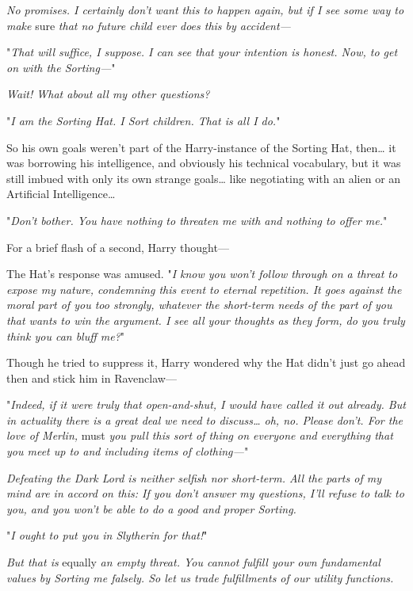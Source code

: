 \emph{No promises. I certainly don't want this to happen again, but if I see 
some way to make} sure\emph{ that no future child ever does this by accident---}

"\emph{That will suffice, I suppose. I can see that your intention is honest. 
Now, to get on with the Sorting---}"

\emph{Wait! What about all my other questions?}

"\emph{I am the Sorting Hat. I Sort children. That is all I do.}"

So his own goals weren't part of the Harry-instance of the Sorting Hat, 
then{\ldots} it was borrowing his intelligence, and obviously his technical 
vocabulary, but it was still imbued with only its own strange goals{\ldots} 
like negotiating with an alien or an Artificial Intelligence{\ldots}

"\emph{Don't bother. You have nothing to threaten me with and nothing to offer 
me.}"

For a brief flash of a second, Harry thought---

The Hat's response was amused. "\emph{I know you won't follow through on a 
threat to expose my nature, condemning this event to eternal repetition. It 
goes against the moral part of you too strongly, whatever the short-term needs 
of the part of you that wants to win the argument. I see all your thoughts as 
they form, do you truly think you can bluff me?}"

Though he tried to suppress it, Harry wondered why the Hat didn't just go ahead 
then and stick him in Ravenclaw---

"\emph{Indeed, if it were truly that open-and-shut, I would have called it out 
already. But in actuality there is a great deal we need to discuss{\ldots} oh, 
no. Please don't. For the love of Merlin,} must\emph{ you pull this sort of 
thing on everyone and everything that you meet up to and including items of 
clothing---}"

\emph{Defeating the Dark Lord is neither selfish nor short-term. All the parts 
of my mind are in accord on this: If you don't answer my questions, I'll refuse 
to talk to you, and you won't be able to do a good and proper Sorting.}

"\emph{I ought to put you in Slytherin for that!}"

\emph{But that is} equally\emph{ an empty threat. You cannot fulfill your own 
fundamental values by Sorting me falsely. So let us trade fulfillments of our 
utility functions.}

